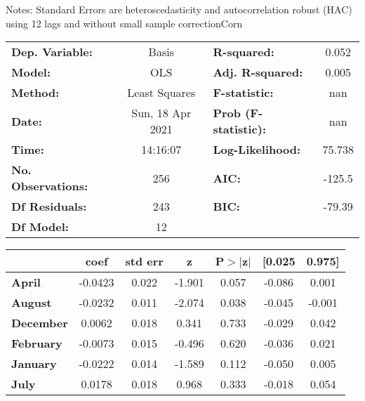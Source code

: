 Notes: \newline
 [1] Standard Errors are heteroscedasticity and autocorrelation robust (HAC) using 12 lags and without small sample correctionCorn\begin{center}
\begin{tabular}{lclc}
\toprule
\textbf{Dep. Variable:}    &      Basis       & \textbf{  R-squared:         } &     0.052   \\
\textbf{Model:}            &       OLS        & \textbf{  Adj. R-squared:    } &     0.005   \\
\textbf{Method:}           &  Least Squares   & \textbf{  F-statistic:       } &       nan   \\
\textbf{Date:}             & Sun, 18 Apr 2021 & \textbf{  Prob (F-statistic):} &      nan    \\
\textbf{Time:}             &     14:16:07     & \textbf{  Log-Likelihood:    } &    75.738   \\
\textbf{No. Observations:} &         256      & \textbf{  AIC:               } &    -125.5   \\
\textbf{Df Residuals:}     &         243      & \textbf{  BIC:               } &    -79.39   \\
\textbf{Df Model:}         &          12      & \textbf{                     } &             \\
\bottomrule
\end{tabular}
\begin{tabular}{lcccccc}
                   & \textbf{coef} & \textbf{std err} & \textbf{z} & \textbf{P$> |$z$|$} & \textbf{[0.025} & \textbf{0.975]}  \\
\midrule
\textbf{April}     &      -0.0423  &        0.022     &    -1.901  &         0.057        &       -0.086    &        0.001     \\
\textbf{August}    &      -0.0232  &        0.011     &    -2.074  &         0.038        &       -0.045    &       -0.001     \\
\textbf{December}  &       0.0062  &        0.018     &     0.341  &         0.733        &       -0.029    &        0.042     \\
\textbf{February}  &      -0.0073  &        0.015     &    -0.496  &         0.620        &       -0.036    &        0.021     \\
\textbf{January}   &      -0.0222  &        0.014     &    -1.589  &         0.112        &       -0.050    &        0.005     \\
\textbf{July}      &       0.0178  &        0.018     &     0.968  &         0.333        &       -0.018    &        0.054     \\

\end{tabular}
\end{center}
